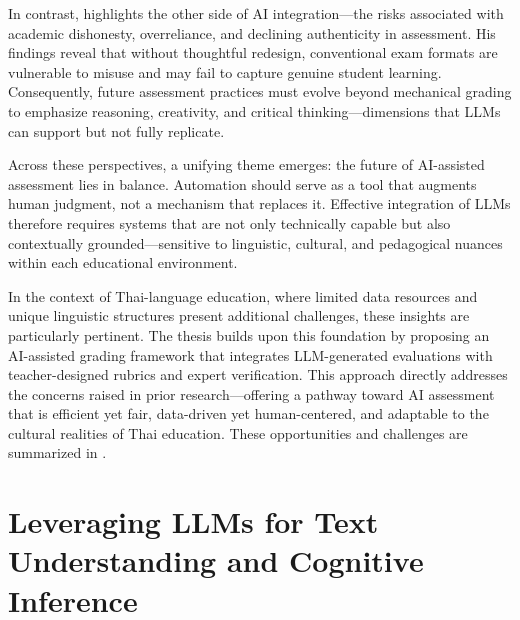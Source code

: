In contrast, \cite{Ryznar2023} highlights the other side of AI 
integration—the risks associated with academic dishonesty, 
overreliance, and declining authenticity in assessment. His 
findings reveal that without thoughtful redesign, conventional 
exam formats are vulnerable to misuse and may fail to capture 
genuine student learning. Consequently, future assessment 
practices must evolve beyond mechanical grading to emphasize 
reasoning, creativity, and critical thinking—dimensions that 
LLMs can support but not fully replicate.

Across these perspectives, a unifying theme emerges: the 
future of AI-assisted assessment lies in balance. Automation 
should serve as a tool that augments human judgment, not a 
mechanism that replaces it. Effective integration of LLMs 
therefore requires systems that are not only technically 
capable but also contextually grounded—sensitive to linguistic, 
cultural, and pedagogical nuances within each educational environment.

In the context of Thai-language education, where limited data 
resources and unique linguistic structures present additional 
challenges, these insights are particularly pertinent. The 
thesis builds upon this foundation by proposing an AI-assisted 
grading framework that integrates LLM-generated evaluations 
with teacher-designed rubrics and expert verification. This 
approach directly addresses the concerns raised in prior 
research—offering a pathway toward AI assessment that is 
efficient yet fair, data-driven yet human-centered, and 
adaptable to the cultural realities of Thai education. 
These opportunities and challenges are summarized in 
.


\section{Leveraging LLMs for Text Understanding and Cognitive Inference}



